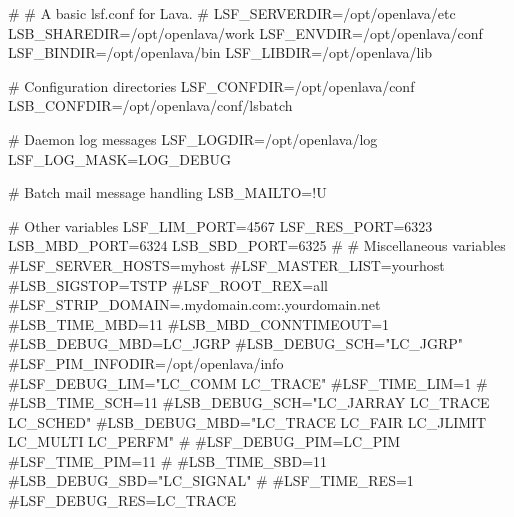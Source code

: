 #
# A basic lsf.conf for Lava. 
#
LSF_SERVERDIR=/opt/openlava/etc
LSB_SHAREDIR=/opt/openlava/work
LSF_ENVDIR=/opt/openlava/conf
LSF_BINDIR=/opt/openlava/bin
LSF_LIBDIR=/opt/openlava/lib

# Configuration directories
LSF_CONFDIR=/opt/openlava/conf
LSB_CONFDIR=/opt/openlava/conf/lsbatch

# Daemon log messages
LSF_LOGDIR=/opt/openlava/log
LSF_LOG_MASK=LOG_DEBUG

# Batch mail message handling
LSB_MAILTO=!U

# Other variables
LSF_LIM_PORT=4567
LSF_RES_PORT=6323
LSB_MBD_PORT=6324
LSB_SBD_PORT=6325
#
# Miscellaneous variables
#LSF_SERVER_HOSTS=myhost
#LSF_MASTER_LIST=yourhost
#LSB_SIGSTOP=TSTP
#LSF_ROOT_REX=all
#LSF_STRIP_DOMAIN=.mydomain.com:.yourdomain.net
#LSB_TIME_MBD=11
#LSB_MBD_CONNTIMEOUT=1
#LSB_DEBUG_MBD=LC_JGRP
#LSB_DEBUG_SCH="LC_JGRP"
#LSF_PIM_INFODIR=/opt/openlava/info
#LSF_DEBUG_LIM="LC_COMM LC_TRACE"
#LSF_TIME_LIM=1
#
#LSB_TIME_SCH=11
#LSB_DEBUG_SCH="LC_JARRAY LC_TRACE LC_SCHED"
#LSB_DEBUG_MBD="LC_TRACE LC_FAIR LC_JLIMIT LC_MULTI LC_PERFM"
#
#LSF_DEBUG_PIM=LC_PIM
#LSF_TIME_PIM=11
#
#LSB_TIME_SBD=11
#LSB_DEBUG_SBD="LC_SIGNAL"
#
#LSF_TIME_RES=1
#LSF_DEBUG_RES=LC_TRACE
